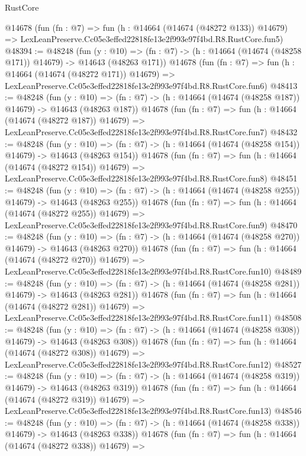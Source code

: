 \begin{lexlean}{RustCore}
\begin{coremodule}
    @14678
    (fun (fn : @7) =>
    fun (h : @14664 (@14674 (@48272 @133)) @14679) =>
    LexLeanPreserve.Cc05e3effed22818fe13e2f993e97f4bd.R8.RustCore.fun5)
@48394 := @48248
    (fun (y : @10) =>
    (fn : @7) -> (h : @14664 (@14674 (@48258 @171)) @14679) -> @14643 (@48263 @171))
    @14678
    (fun (fn : @7) =>
    fun (h : @14664 (@14674 (@48272 @171)) @14679) =>
    LexLeanPreserve.Cc05e3effed22818fe13e2f993e97f4bd.R8.RustCore.fun6)
@48413 := @48248
    (fun (y : @10) =>
    (fn : @7) -> (h : @14664 (@14674 (@48258 @187)) @14679) -> @14643 (@48263 @187))
    @14678
    (fun (fn : @7) =>
    fun (h : @14664 (@14674 (@48272 @187)) @14679) =>
    LexLeanPreserve.Cc05e3effed22818fe13e2f993e97f4bd.R8.RustCore.fun7)
@48432 := @48248
    (fun (y : @10) =>
    (fn : @7) -> (h : @14664 (@14674 (@48258 @154)) @14679) -> @14643 (@48263 @154))
    @14678
    (fun (fn : @7) =>
    fun (h : @14664 (@14674 (@48272 @154)) @14679) =>
    LexLeanPreserve.Cc05e3effed22818fe13e2f993e97f4bd.R8.RustCore.fun8)
@48451 := @48248
    (fun (y : @10) =>
    (fn : @7) -> (h : @14664 (@14674 (@48258 @255)) @14679) -> @14643 (@48263 @255))
    @14678
    (fun (fn : @7) =>
    fun (h : @14664 (@14674 (@48272 @255)) @14679) =>
    LexLeanPreserve.Cc05e3effed22818fe13e2f993e97f4bd.R8.RustCore.fun9)
@48470 := @48248
    (fun (y : @10) =>
    (fn : @7) -> (h : @14664 (@14674 (@48258 @270)) @14679) -> @14643 (@48263 @270))
    @14678
    (fun (fn : @7) =>
    fun (h : @14664 (@14674 (@48272 @270)) @14679) =>
    LexLeanPreserve.Cc05e3effed22818fe13e2f993e97f4bd.R8.RustCore.fun10)
@48489 := @48248
    (fun (y : @10) =>
    (fn : @7) -> (h : @14664 (@14674 (@48258 @281)) @14679) -> @14643 (@48263 @281))
    @14678
    (fun (fn : @7) =>
    fun (h : @14664 (@14674 (@48272 @281)) @14679) =>
    LexLeanPreserve.Cc05e3effed22818fe13e2f993e97f4bd.R8.RustCore.fun11)
@48508 := @48248
    (fun (y : @10) =>
    (fn : @7) -> (h : @14664 (@14674 (@48258 @308)) @14679) -> @14643 (@48263 @308))
    @14678
    (fun (fn : @7) =>
    fun (h : @14664 (@14674 (@48272 @308)) @14679) =>
    LexLeanPreserve.Cc05e3effed22818fe13e2f993e97f4bd.R8.RustCore.fun12)
@48527 := @48248
    (fun (y : @10) =>
    (fn : @7) -> (h : @14664 (@14674 (@48258 @319)) @14679) -> @14643 (@48263 @319))
    @14678
    (fun (fn : @7) =>
    fun (h : @14664 (@14674 (@48272 @319)) @14679) =>
    LexLeanPreserve.Cc05e3effed22818fe13e2f993e97f4bd.R8.RustCore.fun13)
@48546 := @48248
    (fun (y : @10) =>
    (fn : @7) -> (h : @14664 (@14674 (@48258 @338)) @14679) -> @14643 (@48263 @338))
    @14678
    (fun (fn : @7) =>
    fun (h : @14664 (@14674 (@48272 @338)) @14679) =>

\end{coremodule}
\end{lexlean}
